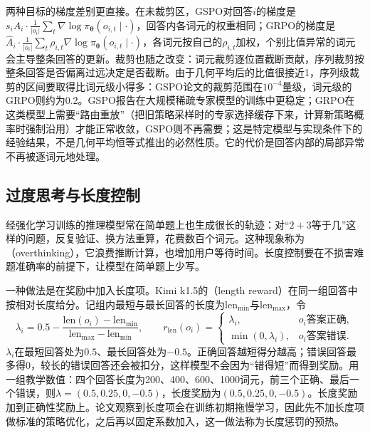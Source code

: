 两种目标的梯度差别更直接。在未裁剪区，GSPO对回答$i$的梯度是$s_i\widehat A_i\cdot\frac1{|o_i|}\sum_t\nabla\log\pi_{\bm\theta}(o_{i,t}\mid\cdot)$，回答内各词元的权重相同；GRPO的梯度是$\widehat A_i\cdot\frac1{|o_i|}\sum_t\rho_{i,t}\nabla\log\pi_{\bm\theta}(o_{i,t}\mid\cdot)$，各词元按自己的$\rho_{i,t}$加权，个别比值异常的词元会主导整条回答的更新。裁剪也随之改变：词元裁剪逐位置截断贡献，序列裁剪按整条回答是否偏离过远决定是否截断。由于几何平均后的比值很接近1，序列级裁剪的区间要取得比词元级小得多：GSPO论文的裁剪范围在$10^{-4}$量级，词元级的GRPO则约为0.2。GSPO报告在大规模稀疏专家模型的训练中更稳定；GRPO在这类模型上需要“路由重放”（把旧策略采样时的专家选择缓存下来，计算新策略概率时强制沿用）才能正常收敛，GSPO则不再需要；这是特定模型与实现条件下的经验结果，不是几何平均恒等式推出的必然性质。它的代价是回答内部的局部异常不再被逐词元地处理。

\subsection{过度思考与长度控制}
\label{sec:nlp-reasoning-overthinking}

经强化学习训练的推理模型常在简单题上也生成很长的轨迹：对“$2+3$等于几”这样的问题，反复验证、换方法重算，花费数百个词元。这种现象称为（overthinking），它浪费推断计算，也增加用户等待时间。长度控制要在不损害难题准确率的前提下，让模型在简单题上少写。

一种做法是在奖励中加入长度项。Kimi k1.5的（length reward）在同一组回答中按相对长度给分。记组内最短与最长回答的长度为$\mathrm{len}_{\min}$与$\mathrm{len}_{\max}$，令
\begin{equation}
  \lambda_i=0.5-\frac{\mathrm{len}(o_i)-\mathrm{len}_{\min}}{\mathrm{len}_{\max}-\mathrm{len}_{\min}},\qquad
  r_{\mathrm{len}}(o_i)=
  \begin{cases}
    \lambda_i, & o_i\text{答案正确},\\
    \min(0,\lambda_i), & o_i\text{答案错误}.
  \end{cases}
  \label{eq:nlp-reasoning-length-reward}
\end{equation}
$\lambda_i$在最短回答处为$0.5$、最长回答处为$-0.5$。正确回答越短得分越高；错误回答最多得0，较长的错误回答还会被扣分，这样模型不会因为“错得短”而得到奖励。用一组教学数值：四个回答长度为200、400、600、1000词元，前三个正确、最后一个错误，则$\lambda=(0.5,0.25,0,-0.5)$，长度奖励为$(0.5,0.25,0,-0.5)$。长度奖励加到正确性奖励上。论文观察到长度项会在训练初期拖慢学习，因此先不加长度项做标准的策略优化，之后再以固定系数加入，这一做法称为长度惩罚的预热。

